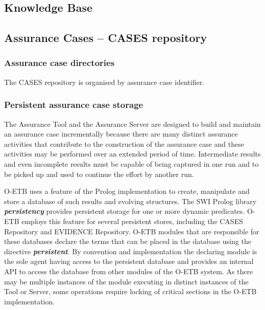 \documentclass[12pt,twoside,a4paper]{article}
\begin{document}
\hypertarget{knowledge-base-2}{%
\subsection{Knowledge Base}\label{knowledge-base-2}}

\hypertarget{assurance-cases-cases-repository}{%
\subsection{Assurance Cases -- CASES repository}\label{assurance-cases-cases-repository}}

\hypertarget{assurance-case-directories}{%
\subsubsection{Assurance case directories}\label{assurance-case-directories}}

The CASES repository is organised by assurance case identifier.

\hypertarget{persistent-assurance-case-storage}{%
\subsubsection{Persistent assurance case storage}\label{persistent-assurance-case-storage}}

The Assurance Tool and the Assurance Server are designed to build and maintain an assurance case incrementally because there are many distinct assurance activities that contribute to the construction of the assurance case and these activities may be performed over an extended period of time. Intermediate results and even incomplete results must be capable of being captured in one run and to be picked up and used to continue the effort by another run.

O-ETB uses a feature of the Prolog implementation to create, manipulate and store a database of such results and evolving structures. The SWI Prolog library \emph{\textbf{persistency}} provides persistent storage for one or more dynamic predicates. O-ETB employs this feature for several persistent stores, including the CASES Repository and EVIDENCE Repository. O-ETB modules that are responsible for these databases declare the terms that can be placed in the database using the directive \emph{\textbf{persistent}}. By convention and implementation the declaring module is the sole agent having access to the persistent database and provides an internal API to access the database from other modules of the O-ETB system. As there may be multiple instances of the module executing in distinct instances of the Tool or Server, some operations require locking of critical sections in the O-ETB implementation.
\end{document}
